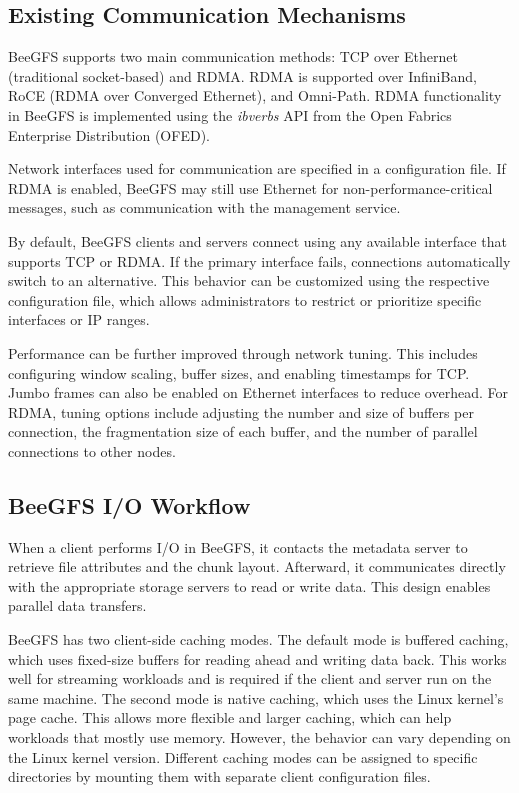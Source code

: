 \subsection{Existing Communication Mechanisms}

BeeGFS supports two main communication methods: TCP over Ethernet (traditional socket-based) and RDMA. RDMA is supported over InfiniBand, RoCE (RDMA over Converged Ethernet), and Omni-Path. RDMA functionality in BeeGFS is implemented using the \textit{ibverbs} API from the Open Fabrics Enterprise Distribution (OFED).

Network interfaces used for communication are specified in a configuration file. If RDMA is enabled, BeeGFS may still use Ethernet for non-performance-critical messages, such as communication with the management service.

By default, BeeGFS clients and servers connect using any available interface that supports TCP or RDMA. If the primary interface fails, connections automatically switch to an alternative. This behavior can be customized using the respective configuration file, which allows administrators to restrict or prioritize specific interfaces or IP ranges.

Performance can be further improved through network tuning. This includes configuring window scaling, buffer sizes, and enabling timestamps for TCP. Jumbo frames can also be enabled on Ethernet interfaces to reduce overhead. For RDMA, tuning options include adjusting the number and size of buffers per connection, the fragmentation size of each buffer, and the number of parallel connections to other nodes.

\subsection{BeeGFS I/O Workflow}
When a client performs I/O in BeeGFS, it contacts the metadata server to retrieve file attributes and the chunk layout. Afterward, it communicates directly with the appropriate storage servers to read or write data. This design enables parallel data transfers.

BeeGFS has two client-side caching modes. The default mode is buffered caching, which uses fixed-size buffers for reading ahead and writing data back. This works well for streaming workloads and is required if the client and server run on the same machine. The second mode is native caching, which uses the Linux kernel's page cache. This allows more flexible and larger caching, which can help workloads that mostly use memory. However, the behavior can vary depending on the Linux kernel version. Different caching modes can be assigned to specific directories by mounting them with separate client configuration files.

